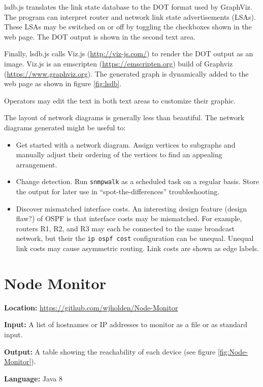 \documentclass[12pt]{article}
\begin{document}
lsdb.js translates the link state database to the DOT format used by GraphViz. The program can interpret router and network link state advertisements (LSAs). These LSAs may be switched on or off by toggling the checkboxes shown in the web page. The DOT output is shown in the second text area.

Finally, lsdb.js calls Viz.js (\url{http://viz-js.com/}) to render the DOT output as an image. Viz.js is an emscripten (\url{https://emscripten.org}) build of Graphviz (\url{https://www.graphviz.org}). The generated graph is dynamically added to the web page as shown in figure \ref{fig:lsdb}.

Operators may edit the text in both text areas to customize their graphic.

The layout of network diagrams is generally less than beautiful. The network diagrams generated might be useful to:

\begin{itemize}
	\item Get started with a network diagram. Assign vertices to subgraphs and manually adjust their ordering of the vertices to find an appealing arrangement.
	\item Change detection. Run \texttt{snmpwalk} as a scheduled task on a regular basis. Store the output for later use in ``spot-the-differences'' troubleshooting.
	\item Discover mismatched interface costs. An interesting design feature (design flaw?) of OSPF is that interface costs may be mismatched. For example, routers R1, R2, and R3 may each be connected to the same broadcast network, but their the \texttt{ip ospf cost} configuration can be unequal. Unequal link costs may cause asymmetric routing. Link costs are shown as edge labels.	
\end{itemize}

\section{Node Monitor}

\noindent \textbf{Location:} \url{https://github.com/wjholden/Node-Monitor}

\noindent \textbf{Input:} A list of hostnames or IP addresses to monitor as a file or as standard input.

\noindent \textbf{Output:} A table showing the reachability of each device (see figure \ref{fig:Node-Monitor}).

\noindent \textbf{Language:} Java 8
\end{document}
